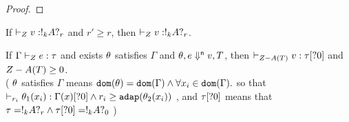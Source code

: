 \begin{proof}

  


  \end{proof} 

\begin{thm}
  If $ \empty  \tvdash{\nnatA} \valr : \bang{k} \ltype \whynot{r}$ and
  $r' \geq r$, 
  then $ \empty  \tvdash{\nnatA} \valr : \bang{k} \ltype \whynot{r}$.
\end{thm}%




\begin{thm}
  If $ \Gamma  \vdash_{Z} e : \tau$
  and  exists $\theta $ satisfies $\Gamma$  and  $\theta, e \mathrel{\Downarrow^{\mathsf{n}}} v, T $,
  then $ \empty  \tvdash{\nnatA- A(\tr)} \valr : \type[?0]$ and
  $Z- A(T) \geq 0 $. \\(
  $\theta$ satisfies $\Gamma$ means $\mathtt{dom}(\theta) = \mathtt{dom}(\Gamma) \land
  \forall x_i \in \mathtt{dom}(\Gamma).  $ so that $\empty
  \tvdash{ r_i } \env_1(x_i) : \Gamma(x)[?0] \land r_i \geq \adap(\env_2(x_i))$ , and $\tau[?0] $ means that $
  \tau = !_{k}A ?_{r} \land \tau[?0]= !_{k}A ?_{0}$ )
\end{thm}%

